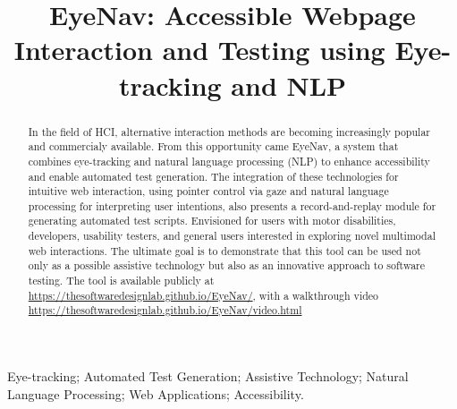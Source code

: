 \documentclass[10pt, conference]{IEEEtran}
\begin{document}
\title{EyeNav: Accessible Webpage Interaction and Testing using Eye-tracking and NLP}

\author{
}

\maketitle

\begin{abstract}
In the field of \ac{HCI}, alternative interaction methods are becoming increasingly popular and commercialy available. From this opportunity came EyeNav, a system that combines eye-tracking and natural language processing (NLP) to enhance accessibility and enable automated test generation. The integration of these technologies for intuitive web interaction, using pointer control via gaze and natural language processing for interpreting user intentions, also presents a record-and-replay module for generating automated test scripts. Envisioned for users with motor disabilities, developers, usability testers, and general users interested in exploring novel multimodal web interactions.
The ultimate goal is to demonstrate that this tool can be used not only as a possible assistive technology but also as an innovative approach to software testing. The tool is available publicly at \href{https://thesoftwaredesignlab.github.io/EyeNav/}{https://thesoftwaredesignlab.github.io/EyeNav/}, with a walkthrough video \href{https://thesoftwaredesignlab.github.io/EyeNav/video.html}{https://thesoftwaredesignlab.github.io/EyeNav/video.html} %
\end{abstract}


\begin{IEEEkeywords}
Eye-tracking; Automated Test Generation; Assistive Technology; Natural Language Processing; Web Applications; Accessibility.
\end{IEEEkeywords}
\end{document}
